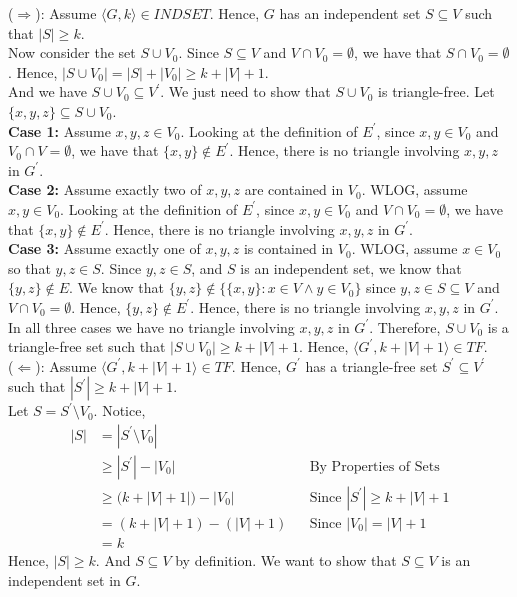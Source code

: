 \documentclass[12pt]{article}
\begin{document}
($\Rightarrow$): Assume $\langle G, k \rangle \in INDSET$. Hence, $G$ has an independent set $S \subseteq V$ such that $|S| \geq k$. \\

Now consider the set $S \cup V_0$. Since $S \subseteq V$ and $V \cap V_0 = \emptyset$, we have that $S \cap V_0 = \emptyset$. Hence, $|S \cup V_0| = |S| + |V_0| \geq k + |V| + 1$. \\

And we have $S \cup V_0 \subseteq V^\prime$. We just need to show that $S \cup V_0$ is triangle-free. Let $\{x,y,z\} \subseteq S \cup V_0$. \\

\textbf{Case 1:} Assume $x,y,z \in V_0$. Looking at the definition of $E^\prime$, since $x,y \in V_0$ and $V_0 \cap V = \emptyset$, we have that $\{x,y\} \not \in E^\prime$. Hence, there is no triangle involving $x,y,z$ in $G^\prime$. \\

\textbf{Case 2:} Assume exactly two of $x,y,z$ are contained in $V_0$. WLOG, assume $x,y \in V_0$. Looking at the definition of $E^\prime$, since $x,y \in V_0$ and $V \cap V_0 = \emptyset$, we have that $\{x,y\} \not \in E^\prime$. Hence, there is no triangle involving $x,y,z$ in $G^\prime$. \\

\textbf{Case 3:} Assume exactly one of $x,y,z$ is contained in $V_0$. WLOG, assume $x \in V_0$ so that $y,z \in S$. Since $y,z \in S$, and $S$ is an independent set, we know that $\{y,z\} \not \in E$. We know that $\{y,z\} \not \in \{\{x,y\} : x \in V \land y \in V_0\}$ since $y,z \in S \subseteq V$ and $V \cap V_0 = \emptyset$. Hence, $\{y,z\} \not \in E^\prime$. Hence, there is no triangle involving $x,y,z$ in $G^\prime$. \\

In all three cases we have no triangle involving $x,y,z$ in $G^\prime$. Therefore, $S \cup V_0$ is a triangle-free set such that $|S \cup V_0| \geq k + |V| + 1$. Hence, $\langle G^\prime, k + |V| + 1 \rangle \in TF$. \\

($\Leftarrow$): Assume $\langle G^\prime, k + |V| + 1 \rangle \in TF$. Hence, $G^\prime$ has a triangle-free set $S^\prime \subseteq V^\prime$ such that $|S^\prime| \geq k + |V| + 1$. \\

Let $S = S^\prime \setminus V_0$. Notice,
\begin{align*}
|S| &= |S^\prime \setminus V_0| \\
&\geq |S^\prime| - |V_0| &&\text{By Properties of Sets} \\
&\geq (k + |V| + 1|) - |V_0| &&\text{Since $|S^\prime| \geq k + |V| + 1$} \\
&= (k + |V| + 1) - (|V| + 1) &&\text{Since $|V_0| = |V| + 1$} \\
&= k
\end{align*}
Hence, $|S| \geq k$. And $S \subseteq V$ by definition. We want to show that $S \subseteq V$ is an independent set in $G$. \\
\end{document}
